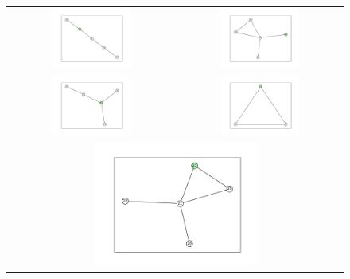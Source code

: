 \documentclass[12pt, a4paper]{extarticle}
\begin{document}
\begin{figure}\centering\begin{tabularx}{\textwidth}{cc}
\includegraphics[width=0.5\textwidth]{task11-graphlets/5_21-17-18-20-23.pdf} &
\includegraphics[width=0.5\textwidth]{task11-graphlets/5_16-18-19-22-23.pdf} \\
\includegraphics[width=0.5\textwidth]{task11-graphlets/5_21-18-20-23-24.pdf} &
\includegraphics[width=0.5\textwidth]{task11-graphlets/3_21-25-23.pdf} \\
\multicolumn{2}{c}{
\includegraphics[width=0.5\textwidth]{task11-graphlets/5_21-25-20-22-23.pdf}}
\end{tabularx}\end{figure}
\end{document}
